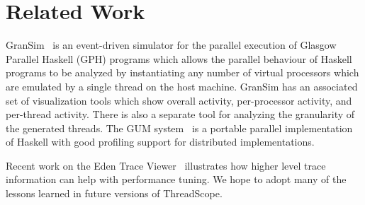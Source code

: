 \section{Related Work}

GranSim~\cite{loidl} is an event-driven simulator for the parallel
execution of Glasgow Parallel Haskell (GPH) programs which allows the
parallel behaviour of Haskell programs to be analyzed by instantiating
any number of virtual processors which are emulated by a single thread
on the host machine. GranSim has an associated set of visualization
tools which show overall activity, per-processor activity, and
per-thread activity. There is also a separate tool for analyzing the
granularity of the generated threads. The GUM
system~\cite{Trinder:gum} is a portable parallel implementation of
Haskell with good profiling support for distributed implementations.

Recent work on the Eden Trace Viewer~\cite{berthold:07} illustrates how higher level trace information can help with performance tuning. We hope to adopt many of the lessons learned in future versions of ThreadScope.
